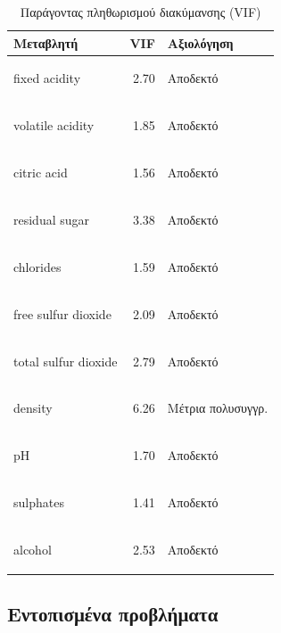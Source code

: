 \documentclass[12pt,a4paper]{article}
\begin{document}
\begin{table}[H]
\centering
\caption{Παράγοντας πληθωρισμού διακύμανσης (VIF)}
\label{tab:vif}
\small
\begin{tabular}{lrl}
\toprule
\textbf{Μεταβλητή} & \textbf{VIF} & \textbf{Αξιολόγηση} \\
\midrule
\begin{english}fixed acidity\end{english}        & 2.70 & Αποδεκτό \\
\begin{english}volatile acidity\end{english}     & 1.85 & Αποδεκτό \\
\begin{english}citric acid\end{english}          & 1.56 & Αποδεκτό \\
\begin{english}residual sugar\end{english}       & 3.38 & Αποδεκτό \\
\begin{english}chlorides\end{english}            & 1.59 & Αποδεκτό \\
\begin{english}free sulfur dioxide\end{english}  & 2.09 & Αποδεκτό \\
\begin{english}total sulfur dioxide\end{english} & 2.79 & Αποδεκτό \\
\begin{english}density\end{english}              & 6.26 & Μέτρια πολυσυγγρ. \\
\begin{english}pH\end{english}                   & 1.70 & Αποδεκτό \\
\begin{english}sulphates\end{english}            & 1.41 & Αποδεκτό \\
\begin{english}alcohol\end{english}              & 2.53 & Αποδεκτό \\
\bottomrule
\end{tabular}
\end{table}

\subsection{Εντοπισμένα προβλήματα}
\end{document}
